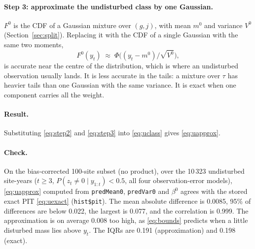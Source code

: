 \documentclass[11pt]{article}
\newcommand{\code}[1]{\texttt{#1}}
\begin{document}
\paragraph{Step 3: approximate the undisturbed class by one Gaussian.}
$F^0$ is the CDF of a Gaussian mixture over $(g, j)$, with mean $m^0$ and variance $V^0$
(Section~\ref{sec:split}). Replacing it with the CDF of a single Gaussian with the same two moments,
\begin{equation}
  F^0(y_t) \;\approx\; \Phi\!\big((y_t - m^0)/\sqrt{V^0}\big),
  \label{eq:step3}
\end{equation}
is accurate near the centre of the distribution, which is where an undisturbed observation usually lands. It is less
accurate in the tails: a mixture over $\tau$ has heavier tails than one Gaussian with the same
variance. It is exact when one component carries all the weight.

\paragraph{Result.} Substituting \eqref{eq:step2} and \eqref{eq:step3} into
\eqref{eq:uclass} gives \eqref{eq:uapprox}.

\paragraph{Check.} On the bias-corrected 100-site subset (no product), over the 10\,323
undisturbed site-years ($t \ge 3$, $P(z_t \ne 0 \mid y_{1:t}) < 0.5$, all four
observation-error models), \eqref{eq:uapprox} computed from \code{predMean0},
\code{predVar0} and $\beta^0$ agrees with the stored exact PIT \eqref{eq:uexact}
(\code{hist\$pit}). The mean absolute difference is 0.0085, 95\% of differences are below 0.022, the
largest is 0.077, and the correlation is 0.999. The approximation is on average 0.008 too
high, as \eqref{eq:bounds} predicts when a little disturbed mass lies above $y_t$. The
IQRs are 0.191 (approximation) and 0.198 (exact).
\end{document}
